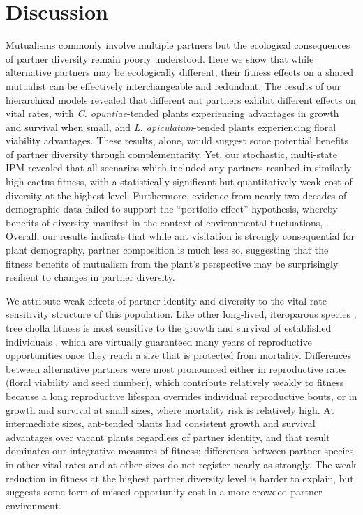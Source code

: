 \documentclass[11pt]{article}
\newcommand{\revise}[1]{{\color{blue}{#1}}}
\begin{document}
\section*{Discussion}
Mutualisms commonly involve multiple partners but the ecological consequences of partner diversity remain poorly understood. 
Here we show that while alternative partners may be ecologically different, their fitness effects on a shared mutualist can be effectively interchangeable and redundant.
The results of our hierarchical models revealed that different ant partners exhibit different effects on vital rates, with \textit{C. opuntiae}-tended plants experiencing advantages in growth and survival when small, and \textit{L. apiculatum}-tended plants experiencing floral viability advantages. 
These results, alone, would suggest some potential benefits of partner diversity through complementarity.  
Yet, our stochastic, multi-state IPM revealed that all scenarios which included any partners resulted in similarly high cactus fitness, with a statistically significant but quantitatively weak cost of diversity at the highest level. 
Furthermore, evidence from nearly two decades of demographic data failed to support the ``portfolio effect'' hypothesis, whereby benefits of diversity manifest in the context of environmental fluctuations, \revise{because fluctuations in the demographic effects of alternative partners are too synchronized}. 
Overall, our results indicate that while ant visitation is strongly consequential for plant demography, partner composition is much less so, suggesting that the fitness benefits of mutualism from the plant's perspective may be surprisingly resilient to changes in partner diversity. 

We attribute weak effects of partner identity and diversity to the vital rate sensitivity structure of this population. 
Like other long-lived, iteroparous species \citep{Franco2004}, tree cholla fitness is most sensitive to the growth and survival of established individuals \citep{Miller2009,elderd2016quantifying}, which are virtually guaranteed many years of reproductive opportunities once they reach a size that is protected from mortality. 
Differences between alternative partners were most pronounced either in reproductive rates (floral viability and seed number), which contribute relatively weakly to fitness because a long reproductive lifespan overrides individual reproductive bouts, or in growth and survival at small sizes, where mortality risk is relatively high. 
At intermediate sizes, ant-tended plants had consistent growth and survival advantages over vacant plants regardless of partner identity, and that result dominates our integrative measures of fitness; differences between partner species in other vital rates and at other sizes do not register nearly as strongly. 
The weak reduction in fitness at the highest partner diversity level is harder to explain, but suggests some form of missed opportunity cost in a more crowded partner environment. 
\end{document}
